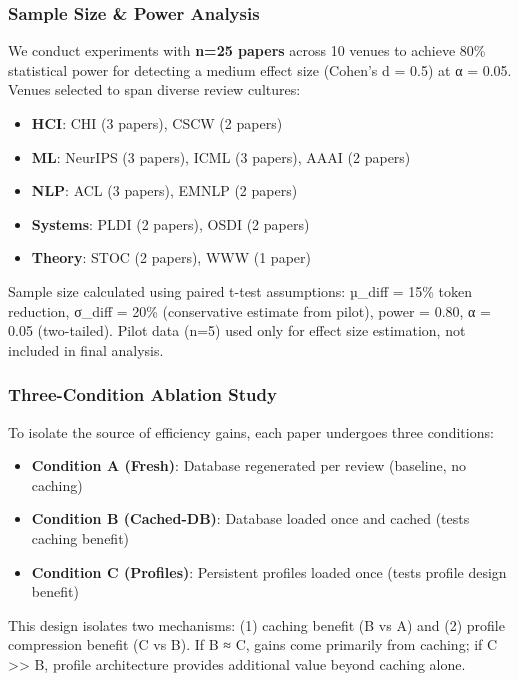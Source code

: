 \subsubsection{Sample Size \& Power Analysis}

We conduct experiments with \textbf{n=25 papers} across 10 venues to achieve 80\% statistical power for detecting a medium effect size (Cohen's d = 0.5) at α = 0.05. Venues selected to span diverse review cultures:

\begin{itemize}
\item \textbf{HCI}: CHI (3 papers), CSCW (2 papers)
\item \textbf{ML}: NeurIPS (3 papers), ICML (3 papers), AAAI (2 papers)
\item \textbf{NLP}: ACL (3 papers), EMNLP (2 papers)
\item \textbf{Systems}: PLDI (2 papers), OSDI (2 papers)
\item \textbf{Theory}: STOC (2 papers), WWW (1 paper)
\end{itemize}

Sample size calculated using paired t-test assumptions: µ\_diff = 15\% token reduction, σ\_diff = 20\% (conservative estimate from pilot), power = 0.80, α = 0.05 (two-tailed). Pilot data (n=5) used only for effect size estimation, not included in final analysis.

\subsubsection{Three-Condition Ablation Study}

To isolate the source of efficiency gains, each paper undergoes three conditions:

\begin{itemize}
\item \textbf{Condition A (Fresh)}: Database regenerated per review (baseline, no caching)
\item \textbf{Condition B (Cached-DB)}: Database loaded once and cached (tests caching benefit)
\item \textbf{Condition C (Profiles)}: Persistent profiles loaded once (tests profile design benefit)
\end{itemize}

This design isolates two mechanisms: (1) caching benefit (B vs A) and (2) profile compression benefit (C vs B). If B ≈ C, gains come primarily from caching; if C >> B, profile architecture provides additional value beyond caching alone.


